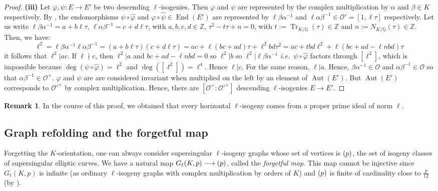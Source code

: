 \documentclass[a4paper,10pt]{report}
\theoremstyle{definition}
\theoremstyle{plain}
\theoremstyle{definition}
\newtheorem{remark}[definition]{Remark}
\newcommand{\ie}{\emph{i.e.}\ }
\newcommand{\Z}{\mathbb{Z}}
\newcommand{\Q}{\mathbb{Q}}
\newcommand{\mO}{\mathcal{O}}
\renewcommand{\(}{\left(}
\renewcommand{\)}{\right)}
\DeclareMathOperator{\End}{End}
\DeclareMathOperator{\Aut}{Aut}
\DeclareMathOperator{\Tr}{Tr}
\let\SS\relax
\DeclareMathOperator{\SS}{SS}
\begin{document}
\begin{proof}
\textbf{(iii)} Let $\varphi, \psi : E\longrightarrow E'$ be two descending $\ell$-isogenies. Then $\varphi$ and $\psi$ are represented by the complex multiplication by $\alpha$ and $\beta\in K$ respectively.  By \cite[exercise 6.10.(b)]{Silverman1},  the endomorphisms $\psi\circ\widehat{\varphi}$ and $\varphi\circ\widehat{\psi}\in\End(E')$ are represented by $\ell\beta\alpha^{-1}$ and $\ell\alpha\beta^{-1}\in\mO'=[1,\ell\tau]$ respectively.  Let us write $\ell\beta\alpha^{-1}=a+b\ell\tau$, $\ell\alpha\beta^{-1}=c+d\ell\tau$, with $a,b,c,d\in\Z$, $\tau^2-t\tau+n=0$, with $t:=\Tr_{K/\Q}(\tau)\in \Z$ and $n:=N_{K/\Q}(\tau)\in \Z$.  Then, we have:
\[\ell^2=\ell\beta\alpha^{-1}\ell\alpha\beta^{-1}=(a+b\ell\tau)(c+d\ell\tau)=ac+\ell(bc+ad)\tau+\ell^2bd\tau^2=ac+tbd\ell^2+\ell(bc+ad-\ell n bd)\tau\]
it follows that $\ell^2|ac$.  If $\ell\nmid c$, then $\ell^2|a$ and $bc+ad-\ell n bd=0$ so $\ell^2|b$ so $\ell^2|\ell\beta\alpha^{-1}$ \ie  $\psi\circ\widehat{\varphi}$ factors through $[\ell^2]$, which is impossible because $\deg(\psi\circ\widehat{\varphi})=\ell^2$ and $\deg([\ell^2])=\ell^4$. Hence $\ell|c$. For the same reason, $\ell|a$. Hence, $\beta\alpha^{-1}\in\mO$ and $\alpha\beta^{-1}\in\mO$ so that $\alpha\beta^{-1}\in\mO^\times$.  $\varphi$ and $\psi$ are are considered invariant when multiplied on the left by an element of $\Aut(E')$. But $\Aut(E')$ corresponds to $\mO'^\times$ by complex multiplication. Hence, there are $[\mO^\times:\mO'^\times]$ descending $\ell$-isogenies $E\longrightarrow E'$.
\end{proof}

\begin{remark}\label{remark 2}
In the course of this proof, we obtained that every horizontal $\ell$-isogeny comes from a proper prime ideal of norm $\ell$.
\end{remark}

\subsection{Graph refolding and the forgetful map}

Forgetting the $K$-orientation, one can always consider supersingular $\ell$-isogeny graphs whose set of vertices is $\SS(p)$, the set of isogeny classes of supersingular elliptic curves. We have a natural map $G_\ell(K,p)\longrightarrow\SS(p)$, called the \emph{forgetful map}. This map cannot be injective since $G_\ell(K,p)$ is infinite (as ordinary $\ell$-isogeny graphs with complex multiplication by orders of $K$) and $\SS(p)$ is finite of cardinality close to $\frac{p}{12}$ (by \cite[theorem V.4.1.(c)]{Silverman1}).
\end{document}
